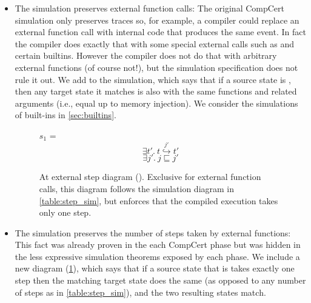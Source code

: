 \begin{itemize}
\item The simulation preserves external function calls: The original CompCert simulation only preserves traces so, for example, a compiler could replace an external function call with internal code that produces the same event. In fact the compiler does exactly that with some special external calls such as  and certain builtins. However the compiler does not do that with arbitrary external functions (of course not!), but the simulation specification does not rule it out.  We add  to the simulation, which says that if a source state is , then any target state it matches is also  with the same functions and related arguments (i.e., equal up to memory injection). We consider the simulations of built-ins in \ref{sec:builtins}.

\begin{figure}\centering\begin{multicols}{2}

 $s_1$ = 
$$\exists t'.\ t \overset{j'}{\hookrightarrow} t'$$
$$\exists j'.\ j \sqsubseteq j'$$

\end{multicols}

\caption[At external step diagram]{At external step diagram (). Exclusive for external function calls, this diagram follows the simulation diagram in \cref{table:step_sim}, but enforces that the compiled execution takes only one step. }\label{figure:atx_sim}
\end{figure}

\item The simulation preserves the number of steps taken by external functions: This fact was already proven in the each CompCert phase but was hidden in the less expressive simulation theorems exposed by each phase. We include a new diagram (\cref{figure:atx_sim}),  which says that if a source state that is  takes exactly one step then the matching target state does the same (as opposed to any number of steps as in  \cref{table:step_sim}), and the two resulting states match. 


\end{itemize}
